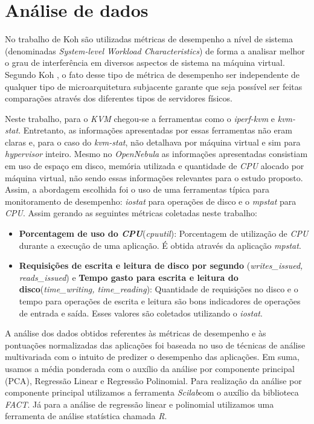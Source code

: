 \section{Análise de dados}
\label{sec:analise-dados}

No trabalho de Koh \cite{koh2007} são utilizadas métricas de desempenho a nível
de sistema (denominadas \textit{System-level Workload Characteristics}) de
forma a analisar melhor o grau de interferência em diversos aspectos de sistema
na máquina virtual. Segundo Koh \cite{koh2007}, o fato desse tipo de métrica de
desempenho ser independente de qualquer tipo de microarquitetura subjacente
garante que seja possível ser feitas comparações através dos diferentes tipos
de servidores físicos.

Neste trabalho, para o \textit{KVM} chegou-se a ferramentas como o
\textit{iperf-kvm} e \textit{kvm-stat}. Entretanto, as informações apresentadas
por essas ferramentas não eram claras e, para o caso do \textit{kvm-stat}, não
detalhava por máquina virtual e sim para  \textit{hypervisor} inteiro. Mesmo no
\textit{OpenNebula} as informações apresentadas consistiam em uso de espaço em
disco, memória utilizada e quantidade de \textit{CPU} alocado por máquina
virtual, não sendo essas informações relevantes para o estudo proposto. Assim,
a abordagem escolhida foi o uso de uma ferramentas típica para monitoramento de
desempenho: \textit{iostat} para operações de disco e o \textit{mpstat} para
\textit{CPU}. Assim gerando as seguintes métricas coletadas neste trabalho:

\begin{itemize}

\item \textbf{Porcentagem de uso do \textit{CPU}}(\textit{cpuutil}):
Porcentagem de utilização de \textit{CPU} durante a execução de uma aplicação.
É obtida através da aplicação \textit{mpstat}.

\item \textbf{Requisições de escrita e leitura de disco por segundo
}(\textit{writes\_issued, reads\_issued}) e \textbf{Tempo gasto para escrita e
leitura do disco}(\textit{time\_writing, time\_reading}): Quantidade de
requisições no disco e o tempo para operações de escrita e leitura são bons
indicadores de operações de entrada e saída. Esses valores são coletados
utilizando o \textit{iostat}.

\end{itemize}

A análise dos dados obtidos referentes às métricas de desempenho e às
pontuações normalizadas das aplicações foi baseada no uso de técnicas de
análise multivariada com o intuito de predizer o desempenho das aplicações. Em
suma, usamos a média ponderada com o auxílio da análise por componente
principal (PCA), Regressão Linear e Regressão Polinomial. Para realização da
análise por componente principal utilizamos a ferramenta \textit{Scilab}com o
auxílio da biblioteca \textit{FACT}. Já para a análise de regressão linear e
polinomial utilizamos uma ferramenta de análise statística chamada \textit{R}.

